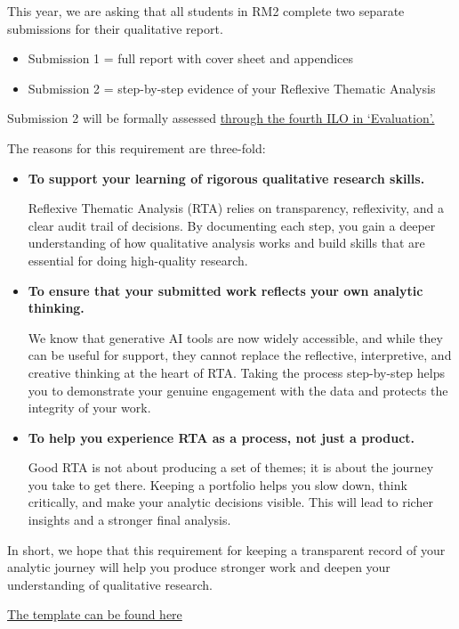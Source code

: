 \documentclass[
  english,
  letterpaper,
  DIV=11,
  numbers=noendperiod]{scrreprt}
\providecommand{\tightlist}{%
  \setlength{\itemsep}{0pt}\setlength{\parskip}{0pt}}
\begin{document}
This year, we are asking that all students in RM2 complete two separate
submissions for their qualitative report.

\begin{itemize}
\tightlist
\item
  Submission 1 = full report with cover sheet and appendices
\item
  Submission 2 = step-by-step evidence of your Reflexive Thematic
  Analysis
\end{itemize}

Submission 2 will be formally assessed \hyperref[report_ILOs]{through
the fourth ILO in `Evaluation'.}

The reasons for this requirement are three-fold:

\begin{itemize}
\item
  \textbf{To support your learning of rigorous qualitative research
  skills.}

  Reflexive Thematic Analysis (RTA) relies on transparency, reflexivity,
  and a clear audit trail of decisions. By documenting each step, you
  gain a deeper understanding of how qualitative analysis works and
  build skills that are essential for doing high-quality research.
\item
  \textbf{To ensure that your submitted work reflects your own analytic
  thinking.}

  We know that generative AI tools are now widely accessible, and while
  they can be useful for support, they cannot replace the reflective,
  interpretive, and creative thinking at the heart of RTA. Taking the
  process step-by-step helps you to demonstrate your genuine engagement
  with the data and protects the integrity of your work.
\item
  \textbf{To help you experience RTA as a process, not just a product.}

  Good RTA is not about producing a set of themes; it is about the
  journey you take to get there. Keeping a portfolio helps you slow
  down, think critically, and make your analytic decisions visible. This
  will lead to richer insights and a stronger final analysis.
\end{itemize}

In short, we hope that this requirement for keeping a transparent record
of your analytic journey will help you produce stronger work and deepen
your understanding of qualitative research.

\href{https://gla-my.sharepoint.com/:w:/g/personal/ashley_robertson_glasgow_ac_uk/EcwNeR1TcCpAi1inMtQgB3cBkucx3-cH3LO-Mk2fseBkOQ?e=LEfvVw}{The
template can be found here}
\end{document}
